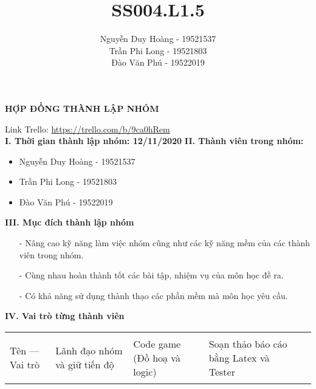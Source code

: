\documentclass{article}
\title{\textbf{SS004.L1.5}}
\author{Nguyễn Duy Hoàng - 19521537\\Trần Phi Long - 19521803\\Đào Văn Phú - 19522019}
\begin{document}
\begin{center}
    \textbf{\Large{HỢP ĐỒNG THÀNH LẬP NHÓM}}
\end{center}

\begin{flushleft}
Link Trello: 
\url{https://trello.com/b/9ca0hRem}\\
\textbf{\large I. Thời gian thành lập nhóm: 12/11/2020}
\newline
\textbf{\large II. Thành viên trong nhóm:}
\begin{center}
    \begin{itemize}
        \item Nguyễn Duy Hoàng - 19521537
        \item Trần Phi Long - 19521803
        \item Đào Văn Phú - 19522019
    \end{itemize}
\end{center}
\textbf{\large III. Mục đích thành lập nhóm}

\begin{itemize}
    \item[-]Nâng cao kỹ năng làm việc nhóm cũng như các kỹ năng mềm của các thành viên trong nhóm.
    \item[-]Cùng nhau hoàn thành tốt các bài tập, nhiệm vụ của môn học đề ra.
    \item[-]Có khả năng sử dụng thành thạo các phần mềm mà môn học yêu cầu.
\end{itemize}
\textbf{\large IV. Vai trò từng thành viên}
\begin{tabular}{|>{\raggedright\arraybackslash}p{3cm}| >{\raggedright\arraybackslash}p{3cm}|
>{\raggedright\arraybackslash}p{3cm}|
>{\raggedright\arraybackslash}p{3cm}|
>{\raggedright\arraybackslash}p{3cm}|}
    \hline
        \begin{center}
            Tên --- Vai trò
        \end{center}

        &Lãnh đạo nhóm và giữ tiến độ

        &Code game (Đồ hoạ và logic)

        &Soạn thảo báo cáo bằng Latex và Tester
        

\end{tabular}
\end{flushleft}
\end{document}
